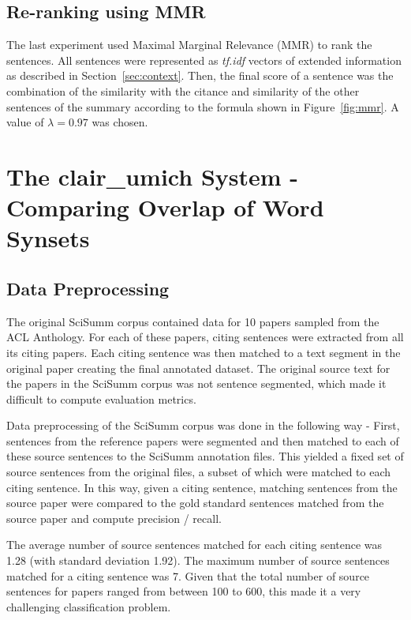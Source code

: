 \documentclass[11pt]{article}
\begin{document}
\subsection{Re-ranking using MMR}
\label{sec:mmr}
The last experiment used Maximal Marginal Relevance (MMR) \cite{Carbonell:1998} 
to rank the sentences. All sentences were represented as \emph{tf.idf} vectors 
of extended information as described in Section~\ref{sec:context}. Then, the 
final score of a sentence was the combination of the similarity with the 
citance and similarity of the other sentences of the summary according to the 
formula shown in Figure~\ref{fig:mmr}. A value of $\lambda=0.97$ was chosen.


\section{The clair\_umich System - Comparing Overlap of Word Synsets}
\subsection{Data Preprocessing}

The original SciSumm corpus contained data for 10 papers sampled from the ACL 
Anthology. For each of these papers, citing sentences were extracted from all 
its citing papers. Each citing sentence was then matched to a text segment in 
the original paper creating the final annotated dataset. The original source 
text for the papers in the SciSumm corpus was not sentence segmented, which 
made it difficult to compute evaluation metrics.

Data preprocessing of the SciSumm corpus was done in the following way - First, 
sentences from the reference papers were segmented and then matched to each of 
these source sentences to the SciSumm annotation files. This yielded a fixed 
set of source sentences from the original files, a subset of which were 
matched to each citing sentence. In this way, given a citing sentence, 
matching sentences from the source paper were compared to the gold standard 
sentences matched from the source paper and compute precision / recall. 

The average number of source sentences matched for each citing sentence was 
1.28 (with standard deviation 1.92). The maximum number of source sentences 
matched for a citing sentence was 7. Given that the total number of source 
sentences for papers ranged from between 100 to 600, this made it a very 
challenging classification problem. 
\end{document}
